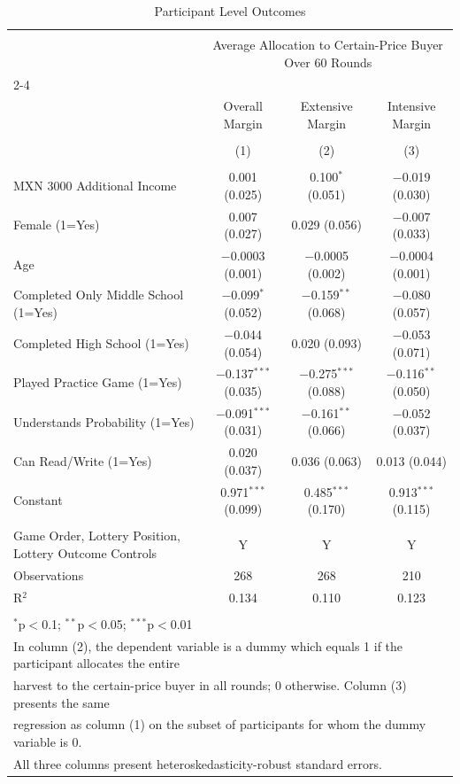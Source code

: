 
\begin{table}[!htbp] \centering 
  \caption{Participant Level Outcomes} 
  \label{participant_level_outcomes} 
\begin{tabular}{@{\extracolsep{5pt}}lccc} 
\\[-1.8ex]\hline 
\hline \\[-1.8ex] 
 & \multicolumn{3}{c}{Average Allocation to Certain-Price Buyer Over 60 Rounds} \\ 
\cline{2-4} 
\\[-1.8ex] & Overall Margin & Extensive Margin & Intensive Margin \\ 
\\[-1.8ex] & (1) & (2) & (3)\\ 
\hline \\[-1.8ex] 
 MXN 3000 Additional Income & 0.001 (0.025) & 0.100$^{*}$ (0.051) & $-$0.019 (0.030) \\ 
  Female (1=Yes) & 0.007 (0.027) & 0.029 (0.056) & $-$0.007 (0.033) \\ 
  Age & $-$0.0003 (0.001) & $-$0.0005 (0.002) & $-$0.0004 (0.001) \\ 
  Completed Only Middle School (1=Yes) & $-$0.099$^{*}$ (0.052) & $-$0.159$^{**}$ (0.068) & $-$0.080 (0.057) \\ 
  Completed High School (1=Yes) & $-$0.044 (0.054) & 0.020 (0.093) & $-$0.053 (0.071) \\ 
  Played Practice Game (1=Yes) & $-$0.137$^{***}$ (0.035) & $-$0.275$^{***}$ (0.088) & $-$0.116$^{**}$ (0.050) \\ 
  Understands Probability (1=Yes) & $-$0.091$^{***}$ (0.031) & $-$0.161$^{**}$ (0.066) & $-$0.052 (0.037) \\ 
  Can Read/Write (1=Yes) & 0.020 (0.037) & 0.036 (0.063) & 0.013 (0.044) \\ 
  Constant & 0.971$^{***}$ (0.099) & 0.485$^{***}$ (0.170) & 0.913$^{***}$ (0.115) \\ 
 \hline \\[-1.8ex] 
Game Order, Lottery Position, Lottery Outcome Controls & Y & Y & Y \\ 
Observations & 268 & 268 & 210 \\ 
R$^{2}$ & 0.134 & 0.110 & 0.123 \\ 
\hline 
\hline \\[-1.8ex] 
\multicolumn{4}{l}{$^{*}$p$<$0.1; $^{**}$p$<$0.05; $^{***}$p$<$0.01} \\ 
\multicolumn{4}{l}{In column (2), the dependent variable is a dummy which equals 1 if the participant allocates the entire} \\ 
\multicolumn{4}{l}{harvest to the certain-price buyer in all rounds; 0 otherwise. Column (3) presents the same} \\ 
\multicolumn{4}{l}{regression as column (1) on the subset of participants for whom the dummy variable is 0.} \\ 
\multicolumn{4}{l}{All three columns present heteroskedasticity-robust standard errors.} \\ 
\end{tabular} 
\end{table} 
